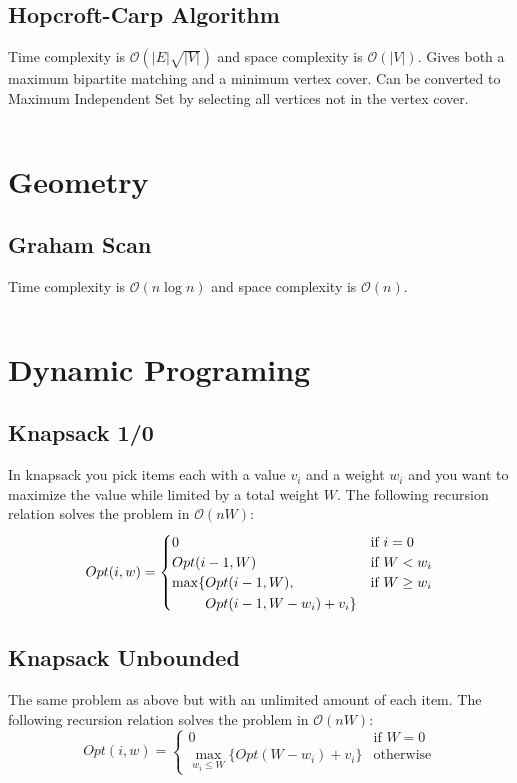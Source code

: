 \documentclass[8pt,a4paper,landscape,oneside]{amsart}
\newcommand{\code}[1]{\inputminted[fontsize=\normalsize,baselinestretch=1]{java}{code/#1}}
\newcommand{\bigO}{\mathcal{O}}
\begin{document}
\begin{multicols*}{3}
  \subsection{Hopcroft-Carp Algorithm}
  Time complexity is $\bigO(|E|\sqrt{|V|})$ and space complexity is $\bigO(|V|)$. Gives both a maximum bipartite matching and a minimum vertex cover. Can be converted to Maximum Independent Set by selecting all vertices not in the vertex cover.
  \code{Graphs/HopcroftCarp.java}
  
  
\section{Geometry}
  \subsection{Graham Scan}
  Time complexity is $\bigO(n\log{n})$ and space complexity is $\bigO(n)$.
  \code{Geometry/GrahamScan.java}
  
\section{Dynamic Programing}
  \subsection{Knapsack 1/0}
  In knapsack you pick items each with a value $v_i$ and a weight $w_i$ and you want to maximize the value while limited by a total weight $W$. The following recursion relation solves the problem in $\bigO(nW)$:
  \[
  Opt(i,w) = \begin{cases}
  0 & \text{if } i=0 \\
  Opt(i-1,W) & \text{if } W<w_i \\
  \begin{aligned}[t]\arraycolsep=0pt
    \max\lbrace &
      Opt(i-1,W), \\ &
      Opt(i-1,W-w_i) + v_i \rbrace
  \end{aligned} & \text{if } W \geq w_i
  \end{cases}
  \]
  
  \subsection{Knapsack Unbounded}
  The same problem as above but with an unlimited amount of each item. The following recursion relation solves the problem in $\bigO(nW)$:
  \[
  Opt(i,w) = \begin{cases}
  0 & \text{if } W=0 \\
  \max\limits_{w_i \leq W} \lbrace Opt(W-w_i) + v_i \rbrace & \text{otherwise}
  \end{cases}
  \]
  

\end{multicols*}
\end{document}
